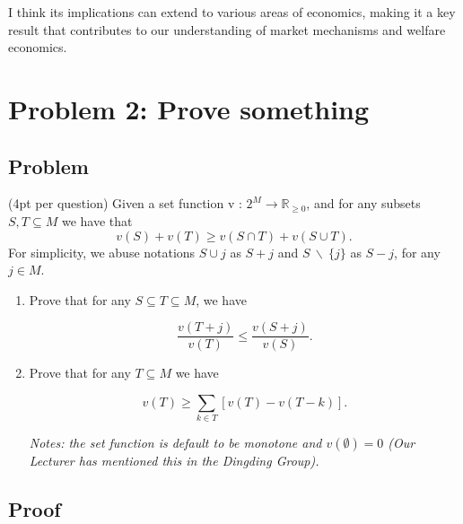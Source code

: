 \documentclass{article}
\begin{document}
I think its implications can extend to various areas of economics, making it a key result that contributes to our understanding of market mechanisms and welfare economics.

\section{Problem 2: Prove something}

\subsection{Problem} (4pt per question) Given a set function v : $2^M \rightarrow \mathbb{R}_{\ge 0}$, and for any subsets $S, T \subseteq M$ we have that
\[
   v(S) + v(T) \ge v(S \cap T) + v(S \cup T)  .
\]
For simplicity, we abuse notations $S \cup {j}$ as $S + j$ and $S~ \backslash~\{j\}$ as $S - j$, for any $j \in M$.

\begin{enumerate}
   \item Prove that for any $S \subseteq T \subseteq M$, we have 
   
\[
  \frac{v(T+j)}{v(T)} \le \frac{v(S+j)}{v(S)}. 
\]
   \item Prove that for any $T \subseteq M$ we have
   
\[
   v(T) \ge \sum_{k \in T} [v(T) - v(T-k)].
\]

\textit{Notes: the set function is default to be monotone and $v(\emptyset) = 0$ (Our Lecturer has mentioned this in the Dingding Group).}

\end{enumerate}

\subsection{Proof}
\end{document}
